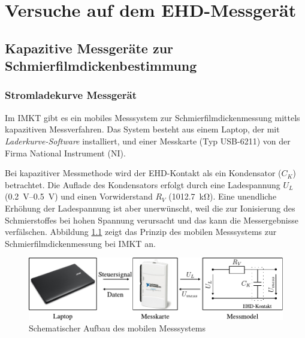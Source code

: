 \chapter{Versuche auf dem EHD-Messgerät}
\label{chap:versuche_auf_dem_ehd_messgeraet}


\section{Kapazitive Messgeräte zur Schmierfilmdickenbestimmung}
\label{sec:kapazitive_messgeraete_zur_schmierfilmdickenbestimmung}

\subsection{Stromladekurve Messgerät}
\label{sub:stromladekurve_messgeraet}

Im IMKT gibt es ein mobiles Messsystem zur Schmierfilmdickenmessung mittels kapazitiven Messverfahren.
Das System besteht aus einem Laptop, der mit \textit{Laderkurve-Software} installiert, und einer Messkarte (Typ USB-6211) von der Firma National Instrument (NI).

Bei kapazitiver Messmethode wird der EHD-Kontakt als ein Kondensator ($C_K$) betrachtet.
Die Auflade des Kondensators erfolgt durch eine Ladespannung $U_L$ (\SIrange{0,2}{0,5}{\volt}) und einen Vorwiderstand $R_V$ (\SI{1012.7}{\kilo\ohm}).
Eine unendliche Erhöhung der Ladespannung ist aber unerwünscht, weil die zur Ionisierung des Schmierstoffes bei hohen Spannung verursacht und das kann die Messergebnisse verfälschen.
Abbildung \ref{fig:Schematischer_aufbau_des_mobilen_messsystems} zeigt das Prinzip des mobilen Messsystems zur Schmierfilmdickenmessung bei IMKT an.
\begin{figure}[htb]
    \centering
    \includegraphics[]{./images/schematischer_aufbau_des_mobilen_messsystem.pdf}
    \caption{Schematischer Aufbau des mobilen Messsystems}
    \label{fig:Schematischer_aufbau_des_mobilen_messsystems}
\end{figure}


